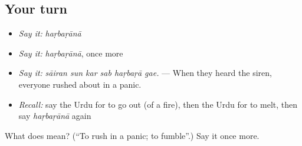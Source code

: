 \subsection*{Your turn}
\begin{itemize}
\raggedright
  \item \emph{Say it:} \emph{haṛbaṛānā}
  \item \emph{Say it:} \emph{haṛbaṛānā}, once more
  \item \emph{Say it:} \emph{sāiran sun kar sab haṛbaṛā gae.} — When they heard the siren, everyone rushed about in a panic.
  \item \emph{Recall:} say the Urdu for to go out (of a fire), then the Urdu for to melt, then say \emph{haṛbaṛānā} again
\end{itemize}

\begin{tcolorbox}[breakable,colback=teal!4,colframe=teal!35!black,title={Before you move on}]
What does  mean? (\textquotedblleft{}To rush in a panic; to fumble\textquotedblright{}.) Say it once more.
\end{tcolorbox}

